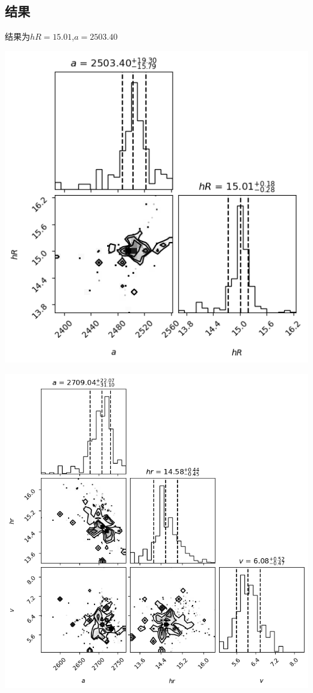 \documentclass[12pt, letterpaper]{article}
\begin{document}
\subsection{结果}
结果为$hR=15.01$,$a=2503.40$

\includegraphics[scale=0.7]{2.png}

\includegraphics[scale=0.7]{3.png}
\end{document}
